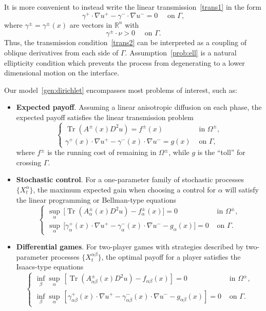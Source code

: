 \documentclass[letter,11pt]{amsart}
\newcommand{\R}{\mathbb{R}}
\newcommand{\tr}[1]{\operatorname{Tr}(#1)}
\theoremstyle{definition}
\numberwithin{equation}{section}
\begin{document}
It is more convenient to instead write the linear transmission~\eqref{trans1} in the form
\begin{equation}
\label{trans2}
\gamma^{+} \cdot \nabla u^{+} - \gamma^{-} \cdot \nabla u^{-} = 0 \quad \text{ on } \Gamma,
\end{equation}
where $\gamma^{\pm} = \gamma^{\pm}(x)$ are vectors in $\R^n$ with
\begin{equation}
\label{prob:ell}
\gamma^{\pm} \cdot \nu > 0 \quad \text{ on } \Gamma.
\end{equation}
Thus, the transmission condition~\eqref{trans2} can be interpreted as a coupling of oblique derivatives from each side of $\Gamma$.
Assumption~\eqref{prob:ell} is a natural ellipticity condition which prevents the process from degenerating to a lower dimensional motion on the interface. 

\medskip

Our model~\eqref{gen:dirichlet} encompasses most problems of interest, such as:
\begin{itemize}
\item \textbf{Expected payoff}.
Assuming a linear anisotropic diffusion on each phase, the expected payoff satisfies the linear transmission problem
\[
\begin{cases}
\tr{A^{\pm}(x) D^2 u} = f^{\pm}(x) & \text{ in } \Omega^{\pm},\\
\gamma^{+}(x) \cdot \nabla u^{+}
- \gamma^{-}(x) \cdot \nabla u^{-}
 = g(x) & \text{ on } \Gamma,
\end{cases}
\]
where $f^{\pm}$ is the running cost of remaining in $\Omega^{\pm}$, while $g$ is the ``toll'' for crossing $\Gamma$.
\item \textbf{Stochastic control}.
For a one-parameter family of stochastic processes $\{X_t^{\alpha}\}$, the maximum expected gain when choosing a control for $\alpha$ will satisfy the linear programming or Bellman-type equations
\[
\begin{cases}
\displaystyle
\sup_{\alpha} \, 
 \Big[
\tr{A_{\alpha}^{\pm}(x) D^2 u} - f_{\alpha}^{\pm}(x)
 \Big] = 0
& \text{ in } \Omega^{\pm},\\
\displaystyle
\sup_{\alpha}  \, \Big[
\gamma^{+}_{\alpha}(x) \cdot \nabla u^{+}
- \gamma^{-}_{\alpha}(x) \cdot \nabla u^{-}
- g_{\alpha}(x)
\Big] = 0
& \text{ on } \Gamma.
\end{cases}
\]
\item \textbf{Differential games}.
For two-player games with strategies described by two-parameter processes $\{X^{\alpha\beta}_{t}\}$, the optimal payoff for a player satisfies the Isaacs-type equations
\[
\begin{cases}
\displaystyle
\inf_{\beta} \sup_{\alpha}
\, \left[
\tr{A_{\alpha\beta}^{\pm}(x) D^2 u} - f_{\alpha\beta}(x)
 \right] = 0
& \text{ in } \Omega^{\pm},\\
\displaystyle
\inf_{\beta}\sup_{\alpha}  \, \left[
\gamma^{+}_{\alpha\beta}(x) \cdot \nabla u^{+}
- \gamma^{-}_{\alpha\beta}(x) \cdot \nabla u^{-}
- g_{\alpha\beta}(x)
\right] = 0
& \text{ on } \Gamma.
\end{cases}
\]
\end{itemize}
\end{document}
